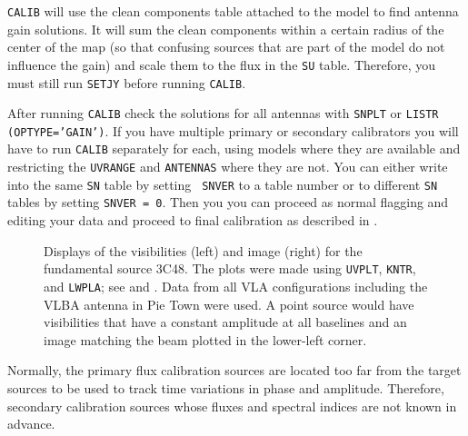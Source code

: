 {\tt CALIB} will use the clean components table attached to the model
to find antenna gain solutions.  It will sum the clean components
within a certain radius of the center of the map (so that confusing
sources that are part of the model do not influence the gain) and
scale them to the flux in the {\tt SU} table. Therefore, you must
still run {\tt SETJY} before running {\tt CALIB}.

After running {\tt CALIB} check the solutions for all antennas with
{\tt SNPLT} or {\tt LISTR (OPTYPE='GAIN')}.  If you have multiple
primary or secondary calibrators you will have to run {\tt CALIB}
separately for each, using models where they are available and
restricting the {\tt UVRANGE} and {\tt ANTENNAS} where they are not.
You can either write into the same {\tt SN} table by setting {\tt
SNVER} to a table number or to different {\tt SN} tables by setting
{\tt SNVER = 0}. Then you you can proceed as normal flagging and
editing your data and proceed to final calibration as described in
.

\begin{figure}
\centering
\caption[3C48 at X-band]{Displays of the visibilities (left) and
image (right) for the fundamental  source 3C48\@.
The plots were made using {\tt UVPLT}, {\tt KNTR}, and {\tt LWPLA};
see  and .  Data from all VLA configurations
including the VLBA antenna in Pie Town were used.  A point source
would have visibilities that have a constant amplitude at all
baselines and an image matching the beam plotted in the lower-left
corner.}
\label{fig:3C48_X}
\end{figure}


Normally, the primary flux calibration sources are located too far
from the target sources to be used to track time variations in phase
and amplitude.  Therefore, secondary calibration sources whose fluxes
and spectral indices are not known in advance.

